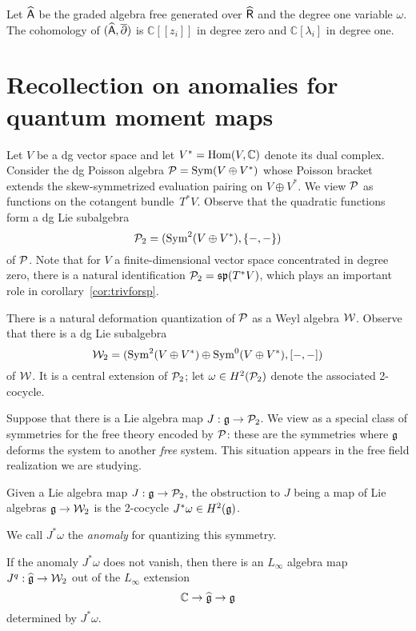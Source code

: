 \documentclass[11pt]{amsart}
\def\C{{\mathbb{C}}}
\begin{document}
Let $\widehat{\mathsf A}$ be the graded algebra free generated over $\widehat{\mathsf R}$ and the degree one variable $\omega$.
The cohomology of $(\widehat{\mathsf A}, {\overline{\partial}})$ is $\C[[z_i]]$ in degree zero and $\C[\lambda_i]$ in degree one.

\section{Recollection on anomalies for quantum moment maps}

Let $V$ be a dg vector space and let $V^* = {\rm Hom}(V, \mathbb C)$ denote its dual complex. 
Consider the dg Poisson algebra $\mathcal P = \operatorname{Sym}(V \oplus V^*)$ whose Poisson bracket extends the skew-symmetrized evaluation pairing on $V \oplus V^*$.
We view $\mathcal P$ as functions on the cotangent bundle~$T^* V$.
Observe that the quadratic functions form a dg Lie subalgebra
\[
\mathcal P_2 = (\operatorname{Sym}^2(V \oplus V^*), \{-,-\})
\]
of $\mathcal P$.
Note that for $V$ a finite-dimensional vector space concentrated in degree zero,
there is a natural identification $\mathcal P_2 = \frak{sp}(T^*V)$, which plays an important role in corollary~\ref{cor:trivforsp}.

There is a natural deformation quantization of $\mathcal P$ as a Weyl algebra $\mathcal W$.
Observe that there is a dg Lie subalgebra
\[
\mathcal W_2 = (\operatorname{Sym}^2(V \oplus V^*) \oplus \operatorname{Sym}^0(V \oplus V^*), [-,-])
\]
of $\mathcal W$.
It is a central extension of $\mathcal P_2$; let $\omega \in H^2(\mathcal P_2)$ denote the associated 2-cocycle.

Suppose that there is a Lie algebra map $J: \mathfrak g \to \mathcal P_2$.
We view as a special class of symmetries for the free theory encoded by $\mathcal P$:
these are the symmetries where $\mathfrak g$ deforms the system to another {\em free} system.
This situation appears in the free field realization we are studying.

\begin{lem}
Given a Lie algebra map $J: \mathfrak g \to \mathcal P_2$, the obstruction to $J$ being a map of Lie algebras $\mathfrak g \to \mathcal W_2$ is the 2-cocycle $J^* \omega \in H^2(\mathfrak g)$.
\end{lem}

We call $J^*\omega$ the {\em anomaly} for quantizing this symmetry.

\begin{cor}
If the anomaly $J^*\omega$ does not vanish, then there is an $L_\infty$ algebra map $J^q: \widehat{\mathfrak g} \to \mathcal W_2$ out of the $L_\infty$ extension
\[
\mathbb C \to \widehat{\mathfrak g} \to \mathfrak g
\]
determined by $J^* \omega$.
\end{cor}
\end{document}
